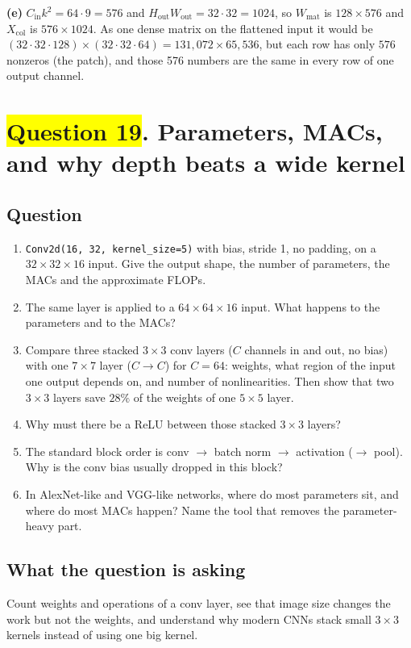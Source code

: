\documentclass[12pt,a4paper]{article}
\newcommand{\hlq}[1]{{\setlength{\fboxsep}{1.5pt}\colorbox{yellow}{#1}}}
\begin{document}
\textbf{(e)} $C_{\text{in}}k^2=64\cdot9=576$ and $H_{\text{out}}W_{\text{out}}=32\cdot32=1024$, so $W_{\text{mat}}$ is $128\times576$ and $X_{\text{col}}$ is $576\times1024$. As one dense matrix on the flattened input it would be $(32\cdot32\cdot128)\times(32\cdot32\cdot64)=131{,}072\times65{,}536$, but each row has only $576$ nonzeros (the patch), and those 576 numbers are the same in every row of one output channel.
\section[Question 19. Parameters, MACs, and why depth beats a wide kernel]{\hlq{Question 19}. Parameters, MACs, and why depth beats a wide kernel}
\subsection*{Question}
\begin{enumerate}[label=(\alph*)]
\item \texttt{Conv2d(16, 32, kernel\_size=5)} with bias, stride 1, no padding, on a $32\times32\times16$ input. Give the output shape, the number of parameters, the MACs and the approximate FLOPs.
\item The same layer is applied to a $64\times64\times16$ input. What happens to the parameters and to the MACs?
\item Compare three stacked $3\times3$ conv layers ($C$ channels in and out, no bias) with one $7\times7$ layer ($C\to C$) for $C=64$: weights, what region of the input one output depends on, and number of nonlinearities. Then show that two $3\times3$ layers save $28\%$ of the weights of one $5\times5$ layer.
\item Why must there be a ReLU between those stacked $3\times3$ layers?
\item The standard block order is conv $\to$ batch norm $\to$ activation ($\to$ pool). Why is the conv bias usually dropped in this block?
\item In AlexNet-like and VGG-like networks, where do most parameters sit, and where do most MACs happen? Name the tool that removes the parameter-heavy part.
\end{enumerate}

\subsection*{What the question is asking}
Count weights and operations of a conv layer, see that image size changes the work but not the weights, and understand why modern CNNs stack small $3\times3$ kernels instead of using one big kernel.
\end{document}
